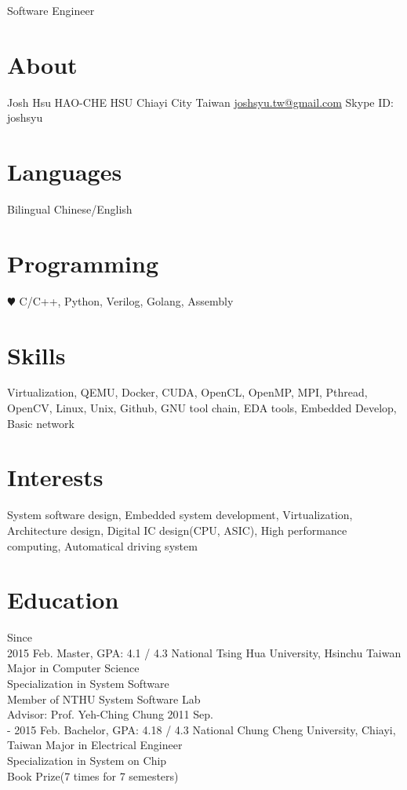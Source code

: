 \documentclass[]{friggeri-cv}
\begin{document}
       {Software Engineer}


\begin{aside}
  \section{About}
    Josh Hsu
    HAO-CHE HSU
	Chiayi City
    Taiwan
	\href{joshsyu.tw@gmail.com}{joshsyu.tw@gmail.com}
	Skype ID: joshsyu
  \section{Languages}
    Bilingual Chinese/English
  \section{Programming}
    {\color{red} $\varheartsuit$} C/C++,
    Python, Verilog, Golang, Assembly
  \section{Skills} 
	Virtualization,
	QEMU, Docker,
	CUDA, OpenCL,
	OpenMP, MPI,
	Pthread, OpenCV,
  	Linux, Unix, Github,
	GNU tool chain,
	EDA tools,
	Embedded Develop,
	Basic network
\end{aside}

\section{Interests}

System software design, Embedded system development,
Virtualization, Architecture design, Digital IC design(CPU, ASIC), 
High performance computing, Automatical driving system
\section{Education}

\begin{entrylist}
  \entry
    {Since \\
	 2015 Feb.}
    {Master, GPA: 4.1 / 4.3}
    {National Tsing Hua University, Hsinchu Taiwan}
	{Major in Computer Science \\
	Specialization in System Software \\
	Member of NTHU System Software Lab \\
	Advisor: Prof. Yeh-Ching Chung}
  \entry
    {2011 Sep. \\
	- 2015 Feb.}
    {Bachelor, GPA: 4.18 / 4.3}
    {National Chung Cheng University, Chiayi, Taiwan}
	{Major in Electrical Engineer \\
	Specialization in System on Chip \\
	Book Prize(7 times for 7 semesters)}
\end{entrylist}
\end{document}
